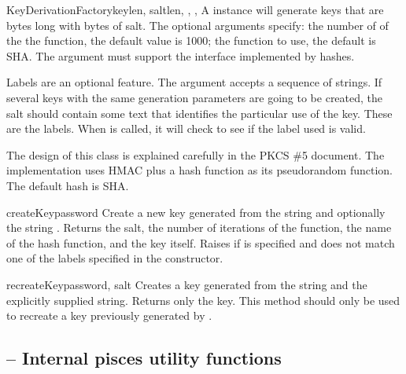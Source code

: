 \documentclass{howto}
\begin{document}
\begin{classdesc}{KeyDerivationFactory}{keylen, saltlen,
	, , }
A  instance will generate keys that are
 bytes long with  bytes of salt.  The
optional arguments specify: the number of  of the the
 function, the default value is 1000; the  function
to use, the default is SHA.  The  argument must support the
interface implemented by  hashes.

Labels are an optional feature.  The  argument accepts a
sequence of strings.  If several keys with the same generation
parameters are going to be created, the salt should contain some text
that identifies the particular use of the key.  These are the labels.
When  is called, it will check to see if the label
used is valid.

The design of this class is explained carefully in the PKCS \#5
document.  The implementation uses HMAC plus a hash function as its
pseudorandom function. The default hash is SHA.

\begin{methoddesc}{createKey}{password }
Create a new key generated from the string  and
optionally the string .  Returns the salt, the number of
iterations of the  function, the name of the hash function, and
the key itself.  Raises  if  is
specified and does not match one of the labels specified in the
constructor.
\end{methoddesc}

\begin{methoddesc}{recreateKey}{password, salt}
Creates a key generated from the string  and the
explicitly supplied  string.  Returns only the key.  This
method should only be used to recreate a key previously generated by
.
\end{methoddesc}

\end{classdesc}

\subsection{ 
	-- Internal pisces utility functions}
\end{document}
